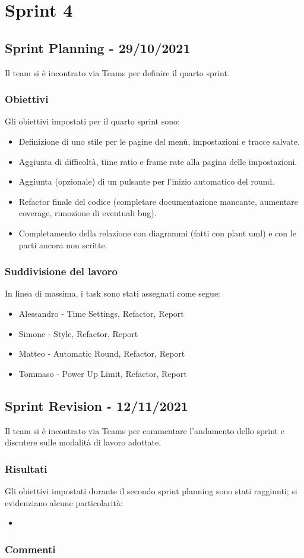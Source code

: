 \section{Sprint 4}
\subsection{Sprint Planning - 29/10/2021}
Il team si è incontrato via Teams per definire il quarto sprint.

\subsubsection{Obiettivi}
Gli obiettivi impostati per il quarto sprint sono:
\begin{itemize}
    \item Definizione di uno stile per le pagine del menù, impostazioni e tracce salvate.
    \item Aggiunta di difficoltà, time ratio e frame rate alla pagina delle impostazioni.
    \item Aggiunta (opzionale) di un pulsante per l'inizio automatico del round.
    \item Refactor finale del codice (completare documentazione mancante, aumentare coverage, rimozione di eventuali bug).
    \item Completamento della relazione con diagrammi (fatti con plant uml) e con le parti ancora non scritte.
\end{itemize}

\subsubsection{Suddivisione del lavoro}
In linea di massima, i task sono stati assegnati come segue:
\begin{itemize}
    \item Alessandro - Time Settings, Refactor, Report
    \item Simone - Style, Refactor, Report
    \item Matteo - Automatic Round, Refactor, Report
    \item Tommaso - Power Up Limit, Refactor, Report
\end{itemize}

\subsection{Sprint Revision - 12/11/2021}
Il team si è incontrato via Teams per commentare l'andamento dello sprint e discutere sulle modalità di lavoro adottate.

\subsubsection{Risultati}
Gli obiettivi impostati durante il secondo sprint planning sono stati raggiunti; si evidenziano alcune particolarità:
\begin{itemize}
    \item
\end{itemize}

\subsubsection{Commenti}
